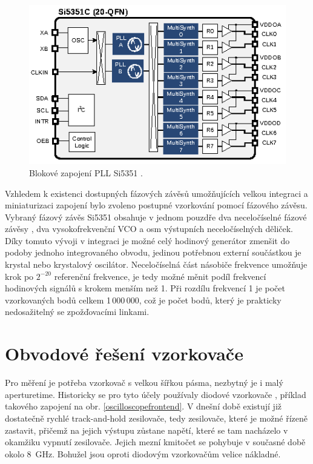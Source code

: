 \begin{figure}[htbp]\includegraphics[width=\textwidth,keepaspectratio]{images/si5351_internal_architecture_overview.eps}\caption{Blokové zapojení \acrshort{PLL} Si5351 \cite{Si5351datasheet}.}\label{5351blockdiagram}\end{figure}

Vzhledem k existenci dostupných fázových závěsů umožňujících velkou integraci a miniaturizaci zapojení bylo zvoleno postupné vzorkování pomocí fázového závěsu. Vybraný fázový závěs Si5351 obsahuje v jednom pouzdře dva neceločíselné fázové závěsy \cite{Si5351datasheet}, dva vysokofrekvenční \acrshort{VCO} a osm výstupních neceločíselných děliček. Díky tomuto vývoji v integraci je možné celý hodinový generátor zmenšit do podoby jednoho integrovaného obvodu, jedinou potřebnou externí součástkou je krystal nebo krystalový oscilátor. Neceločíselná část násobiče frekvence umožňuje krok po $2^{{-20}}$ referenční frekvence, je tedy možné měnit podíl frekvencí hodinových signálů s krokem menším než \SI{1}{\ppm}. Při rozdílu frekvencí \SI{1}{\ppm} je počet vzorkovaných bodů celkem 1\,000\,000, což je počet bodů, který je prakticky nedosažitelný se zpožďovacími linkami.

\section{Obvodové řešení vzorkovače}
Pro měření je potřeba vzorkovač s velkou šířkou pásma, nezbytný je i malý \gls{aperturetime}. Historicky se pro tyto účely používaly diodové vzorkovače \cite{S-1manual} \cite{S-4manual}, příklad takového zapojení na obr. \ref{oscilloscopefrontend}. V dnešní době existují již dostatečně rychlé track-and-hold zesilovače, tedy zesilovače, které je možné řízeně zastavit, přičemž na jejich výstupu zůstane napětí, které se tam nacházelo v okamžiku vypnutí zesilovače. Jejich mezní kmitočet se pohybuje v současné době okolo \SI{8}{\giga\hertz}. Bohužel jsou oproti diodovým vzorkovačům velice nákladné.

